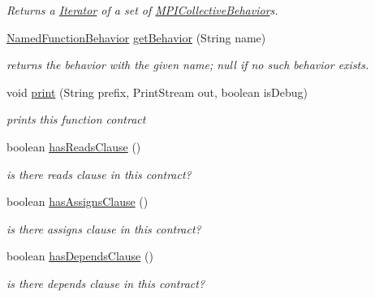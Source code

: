 \begin{DoxyCompactItemize}
\begin{DoxyCompactList}\small\item\em Returns a \hyperlink{}{Iterator} of a set of \hyperlink{interfaceedu_1_1udel_1_1cis_1_1vsl_1_1civl_1_1model_1_1IF_1_1contract_1_1MPICollectiveBehavior}{M\+P\+I\+Collective\+Behavior}s. \end{DoxyCompactList}\item 
\hyperlink{interfaceedu_1_1udel_1_1cis_1_1vsl_1_1civl_1_1model_1_1IF_1_1contract_1_1NamedFunctionBehavior}{Named\+Function\+Behavior} \hyperlink{interfaceedu_1_1udel_1_1cis_1_1vsl_1_1civl_1_1model_1_1IF_1_1contract_1_1FunctionContract_a3b0a97d20987bb04950b88cf90ab03ba}{get\+Behavior} (String name)
\begin{DoxyCompactList}\small\item\em returns the behavior with the given name; null if no such behavior exists. \end{DoxyCompactList}\item 
void \hyperlink{interfaceedu_1_1udel_1_1cis_1_1vsl_1_1civl_1_1model_1_1IF_1_1contract_1_1FunctionContract_a7e30ef304269818ac937e5e58d349b39}{print} (String prefix, Print\+Stream out, boolean is\+Debug)
\begin{DoxyCompactList}\small\item\em prints this function contract \end{DoxyCompactList}\item 
boolean \hyperlink{interfaceedu_1_1udel_1_1cis_1_1vsl_1_1civl_1_1model_1_1IF_1_1contract_1_1FunctionContract_a0aa7299a1200d9f1c91de912571b6490}{has\+Reads\+Clause} ()
\begin{DoxyCompactList}\small\item\em is there reads clause in this contract? \end{DoxyCompactList}\item 
boolean \hyperlink{interfaceedu_1_1udel_1_1cis_1_1vsl_1_1civl_1_1model_1_1IF_1_1contract_1_1FunctionContract_a4feafe0ab78d578803915245235e82cc}{has\+Assigns\+Clause} ()
\begin{DoxyCompactList}\small\item\em is there assigns clause in this contract? \end{DoxyCompactList}\item 
boolean \hyperlink{interfaceedu_1_1udel_1_1cis_1_1vsl_1_1civl_1_1model_1_1IF_1_1contract_1_1FunctionContract_a23b415e93acbaf3c0df6132e9c066e17}{has\+Depends\+Clause} ()
\begin{DoxyCompactList}\small\item\em is there depends clause in this contract? \end{DoxyCompactList}\item 

\end{DoxyCompactItemize}
